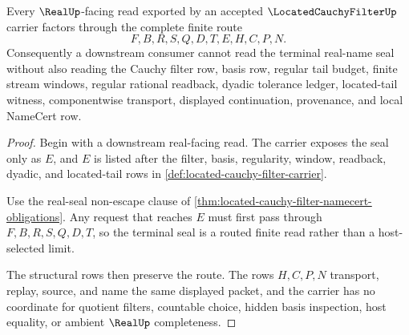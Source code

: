\begin{theorem}
\label{thm:located-cauchy-filter-real-seal-boundary}
Every $\RealUp$-facing read exported by an accepted $\LocatedCauchyFilterUp$ carrier factors through the complete finite route
$$
F,B,R,S,Q,D,T,E,H,C,P,N.
$$
Consequently a downstream consumer cannot read the terminal real-name seal without also reading the Cauchy filter row, basis row, regular tail budget, finite stream windows, regular rational readback, dyadic tolerance ledger, located-tail witness, componentwise transport, displayed continuation, provenance, and local NameCert row.
\end{theorem}
\begin{proof}
Begin with a downstream real-facing read. The carrier exposes the seal only as $E$, and $E$ is listed after the filter, basis, regularity, window, readback, dyadic, and located-tail rows in \autoref{def:located-cauchy-filter-carrier}.

Use the real-seal non-escape clause of \autoref{thm:located-cauchy-filter-namecert-obligations}. Any request that reaches $E$ must first pass through $F,B,R,S,Q,D,T$, so the terminal seal is a routed finite read rather than a host-selected limit.

The structural rows then preserve the route. The rows $H,C,P,N$ transport, replay, source, and name the same displayed packet, and the carrier has no coordinate for quotient filters, countable choice, hidden basis inspection, host equality, or ambient $\RealUp$ completeness.
\end{proof}


